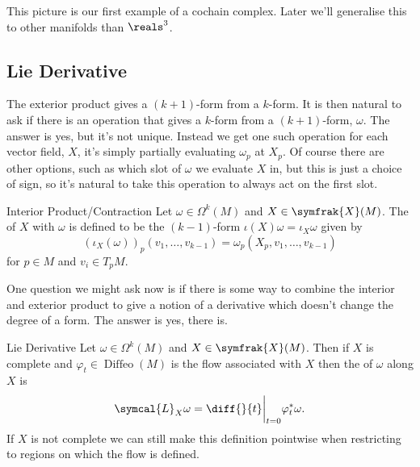 \documentclass[fleqn]{NotesClass}
\newcommand{\vectorFields}{\symfrak{X}}
\DeclareMathOperator{\Diffeo}{Diffeo}
\newcommand{\lieDerivative}{\symcal{L}}
\begin{document}
    This picture is our first example of a cochain complex.
    Later we'll generalise this to other manifolds than \(\reals^3\).
    
    \subsection{Lie Derivative}
    
    The exterior product gives a \((k + 1)\)-form from a \(k\)-form.
    It is then natural to ask if there is an operation that gives a \(k\)-form from a \((k + 1)\)-form, \(\omega\).
    The answer is yes, but it's not unique.
    Instead we get one such operation for each vector field, \(X\), it's simply partially evaluating \(\omega_p\) at \(X_p\).
    Of course there are other options, such as which slot of \(\omega\) we evaluate \(X\) in, but this is just a choice of sign, so it's natural to take this operation to always act on the first slot.
    
    \begin{dfn}{Interior Product/Contraction}{}
        Let \(\omega \in \Omega^{k}(M)\) and \(X \in \vectorFields(M)\).
        The  of \(X\) with \(\omega\) is defined to be the \((k - 1)\)-form \(\iota(X)\omega = \iota_X\omega\) given by
        \begin{equation}
            (\iota_X(\omega))_p (v_1, \dotsc, v_{k-1}) = \omega_p(X_p, v_1, \dotsc, v_{k-1})
        \end{equation}
        for \(p \in M\) and \(v_i \in T_pM\).
    \end{dfn}
    
    One question we might ask now is if there is some way to combine the interior and exterior product to give a notion of a derivative which doesn't change the degree of a form.
    The answer is yes, there is.
    
    \begin{dfn}{Lie Derivative}{}
        Let \(\omega \in \Omega^k(M)\) and \(X \in \vectorFields(M)\).
        Then if \(X\) is complete and \(\varphi_t \in \Diffeo(M)\) is the flow associated with \(X\) then the  of \(\omega\) along \(X\) is
        \begin{equation}
            \lieDerivative_X\omega = \diff{}{t}\bigg|_{t=0} \varphi^*_t \omega.
        \end{equation}
        If \(X\) is not complete we can still make this definition pointwise when restricting to regions on which the flow is defined.
    \end{dfn}
    
\end{document}
